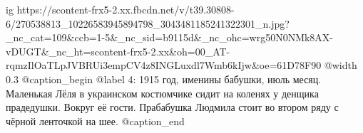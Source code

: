  
 
 
 
 

\ifcmt
  ig https://scontent-frx5-2.xx.fbcdn.net/v/t39.30808-6/270538813_10226583945894798_3043481185241322301_n.jpg?_nc_cat=109&ccb=1-5&_nc_sid=b9115d&_nc_ohc=wrg50N0NMk8AX-vDUGT&_nc_ht=scontent-frx5-2.xx&oh=00_AT-rqmzIlOaTLpJVBRUi3empCV4z8INGLuxdl7Wmb6kIjw&oe=61D78F90
  @width 0.3
	@caption_begin
		@label 4:
		1915 год, именины бабушки, июль месяц. Маленькая Лёля в украинском
		костюмчике сидит на коленях у денщика прадедушки. Вокруг её гости.
		Прабабушка Людмила стоит во втором ряду с чёрной ленточкой на шее.
	@caption_end
\fi
